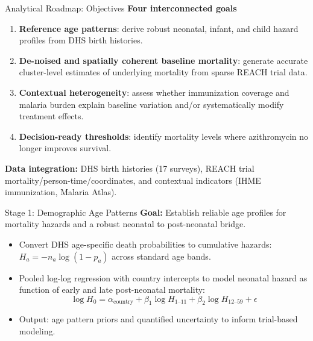 \documentclass[aspectratio=169]{beamer}\usepackage[]{graphicx}\usepackage[dvipsnames]{xcolor}
\begin{document}
\begin{frame}{Analytical Roadmap: Objectives}
\textbf{Four interconnected goals}

\begin{enumerate}
  \item \textbf{Reference age patterns}: derive robust neonatal, infant, and child hazard profiles from DHS birth histories.
  \item \textbf{De-noised and spatially coherent baseline mortality}: generate accurate cluster-level estimates of underlying mortality from sparse REACH trial data.
  \item \textbf{Contextual heterogeneity}: assess whether immunization coverage and malaria burden explain baseline variation and/or systematically modify treatment effects.
  \item \textbf{Decision-ready thresholds}: identify mortality levels where azithromycin no longer improves survival.
\end{enumerate}

\vspace{0.4cm}
\textbf{Data integration:} DHS birth histories (17 surveys), REACH trial mortality/person-time/coordinates, and contextual indicators (IHME immunization, Malaria Atlas).
\end{frame}

\begin{frame}{Stage 1: Demographic Age Patterns}
\textbf{Goal:} Establish reliable age profiles for mortality hazards and a robust neonatal to post-neonatal bridge.

\begin{itemize}
  \item Convert DHS age-specific death probabilities to cumulative hazards:
        $H_a = -n_a \log(1 - p_a)$ across standard age bands.
  \item Pooled log-log regression with country intercepts to model neonatal hazard as function of early and late post-neonatal mortality:
        \[
          \log H_0 = \alpha_{\text{country}} + \beta_1 \log H_{1\text{--}11}
                     + \beta_2 \log H_{12\text{--}59} + \epsilon
        \]
  \item Output: age pattern priors and quantified uncertainty to inform trial-based modeling.
\end{itemize}
\end{frame}
\end{document}
